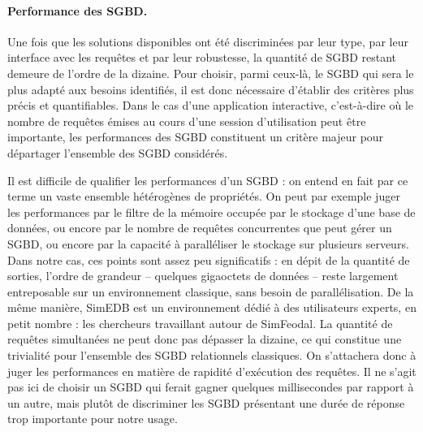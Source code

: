 \paragraph{Performance des SGBD.}

Une fois que les solutions disponibles ont été discriminées par leur type, par leur interface avec les requêtes et par leur robustesse, la quantité de SGBD restant demeure de l'ordre de la dizaine.
Pour choisir, parmi ceux-là, le SGBD qui sera le plus adapté aux besoins identifiés, il est donc nécessaire d'établir des critères plus précis et quantifiables.
Dans le cas d'une application interactive, c'est-à-dire où le nombre de requêtes émises au cours d'une session d'utilisation peut être importante, les performances des SGBD constituent un critère majeur pour départager l'ensemble des SGBD considérés.

Il est difficile de qualifier les \og performances\fg{} d'un SGBD : on entend en fait par ce terme un vaste ensemble hétérogènes de propriétés.
On peut par exemple juger les performances par le filtre de la mémoire occupée par le stockage d'une base de données, ou encore par le nombre de requêtes concurrentes que peut gérer un SGBD, ou encore par la capacité à paralléliser le stockage sur plusieurs serveurs.
Dans notre cas, ces points sont assez peu significatifs : en dépit de la quantité de sorties, l'ordre de grandeur -- quelques gigaoctets de données -- reste largement entreposable sur un environnement classique, sans besoin de parallélisation.
De la même manière, SimEDB est un environnement dédié à des utilisateurs experts, en petit nombre : les chercheurs travaillant autour de SimFeodal.
La quantité de requêtes simultanées ne peut donc pas dépasser la dizaine, ce qui constitue une trivialité pour l'ensemble des SGBD relationnels classiques.
On s'attachera donc à juger les performances en matière de rapidité d'exécution des requêtes.
Il ne s'agit pas ici de choisir un SGBD qui ferait gagner quelques millisecondes par rapport à un autre, mais plutôt de discriminer les SGBD présentant une durée de réponse trop importante pour notre usage.

